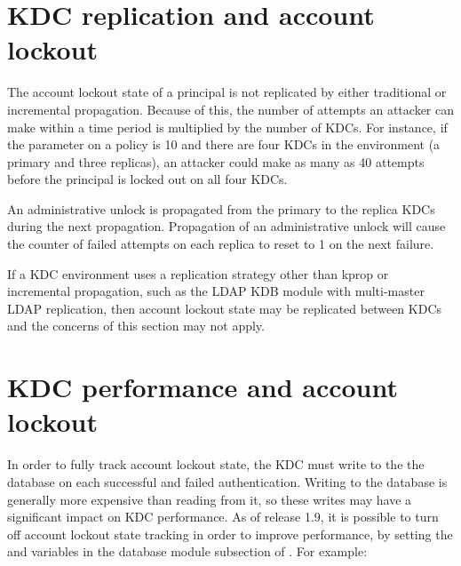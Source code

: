 \documentclass[letterpaper,10pt,english]{sphinxmanual}
\begin{document}
\section{KDC replication and account lockout}
\label{\detokenize{admin/lockout:kdc-replication-and-account-lockout}}
The account lockout state of a principal is not replicated by either
traditional {\hyperref[\detokenize{admin/admin_commands/kprop:kprop-8}]{}} or incremental propagation.  Because of
this, the number of attempts an attacker can make within a time period
is multiplied by the number of KDCs.  For instance, if the
 parameter on a policy is 10 and there are four KDCs in
the environment (a primary and three replicas), an attacker could make
as many as 40 attempts before the principal is locked out on all four
KDCs.

An administrative unlock is propagated from the primary to the replica
KDCs during the next propagation.  Propagation of an administrative
unlock will cause the counter of failed attempts on each replica to
reset to 1 on the next failure.

If a KDC environment uses a replication strategy other than kprop or
incremental propagation, such as the LDAP KDB module with multi-master
LDAP replication, then account lockout state may be replicated between
KDCs and the concerns of this section may not apply.


\section{KDC performance and account lockout}
\label{\detokenize{admin/lockout:kdc-performance-and-account-lockout}}\label{\detokenize{admin/lockout:disable-lockout}}
In order to fully track account lockout state, the KDC must write to
the the database on each successful and failed authentication.
Writing to the database is generally more expensive than reading from
it, so these writes may have a significant impact on KDC performance.
As of release 1.9, it is possible to turn off account lockout state
tracking in order to improve performance, by setting the
 and  variables in the
database module subsection of {\hyperref[\detokenize{admin/conf_files/kdc_conf:kdc-conf-5}]{}}.  For example:

%
\begin{sphinxVerbatim}[commandchars=\\\{\}]
\PYG{p}{[}\PYG{p}{]}
      
          
          
\end{sphinxVerbatim}
\end{document}
